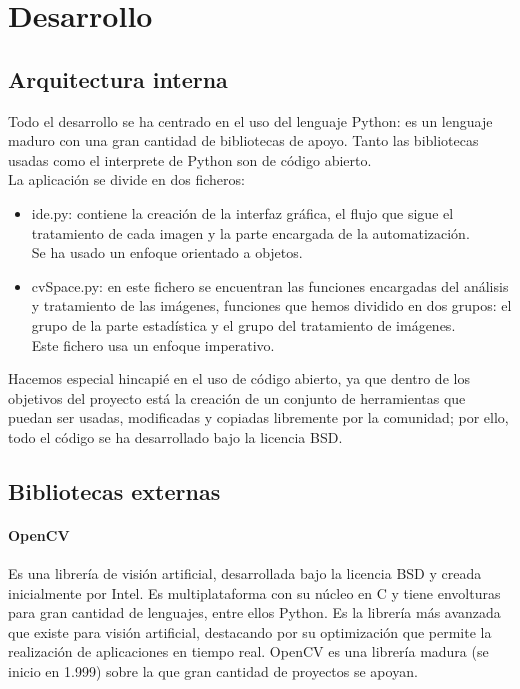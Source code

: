 	\section{Desarrollo}
	\subsection{Arquitectura interna}
	Todo el desarrollo se ha centrado en el uso del lenguaje Python: es un lenguaje maduro con una gran cantidad de bibliotecas de apoyo. Tanto las bibliotecas usadas como el interprete de Python son de código abierto.\\
	La aplicación se divide en dos ficheros:
	\begin{itemize}
	\item ide.py: contiene la creación de la interfaz gráfica, el flujo que sigue el tratamiento de cada imagen y la parte encargada de la automatización.\\ Se ha usado un enfoque orientado a objetos.
	\item cvSpace.py: en este fichero se encuentran las funciones encargadas del análisis y tratamiento de las imágenes, funciones que hemos dividido en dos grupos: el grupo de la parte estadística y el grupo del tratamiento de imágenes.\\ Este fichero usa un enfoque imperativo.
	\end{itemize}
	
	 Hacemos especial hincapié en el uso de código abierto, ya que dentro de los objetivos del proyecto está la creación de un conjunto de herramientas que puedan ser usadas, modificadas y copiadas libremente por la comunidad; por ello, todo el código se ha desarrollado bajo la licencia BSD.
	\subsection{Bibliotecas externas}
	\paragraph{OpenCV}
	Es una librería de visión artificial, desarrollada bajo la licencia BSD y creada inicialmente por Intel. Es multiplataforma con su núcleo en C y tiene envolturas para gran cantidad de lenguajes, entre ellos Python. Es la librería más avanzada que existe para visión artificial, destacando por su optimización que permite la realización de aplicaciones en tiempo real. OpenCV es una librería madura (se inicio en 1.999) sobre la que gran cantidad de proyectos se apoyan.\\
